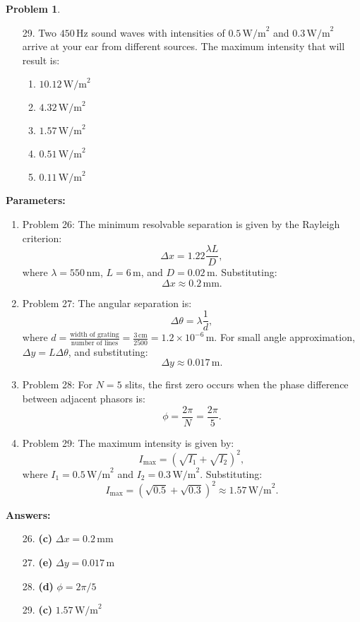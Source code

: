 \documentclass[12pt]{article}
\theoremstyle{definition} %
\newtheorem{problem}{Problem}
\theoremstyle{plain} %
\begin{document}
\begin{problem}
\begin{enumerate}
    \item[29.] Two \(450 \, \text{Hz}\) sound waves with intensities of \(0.5 \, \text{W/m}^2\) and \(0.3 \, \text{W/m}^2\) arrive at your ear from different sources. The maximum intensity that will result is:
    \begin{enumerate}
        \item \(10.12 \, \text{W/m}^2\)
        \item \(4.32 \, \text{W/m}^2\)
        \item \textbf{\(1.57 \, \text{W/m}^2\)}
        \item \(0.51 \, \text{W/m}^2\)
        \item \(0.11 \, \text{W/m}^2\)
    \end{enumerate}
\end{enumerate}

\textbf{Parameters:}
\begin{enumerate}
    \item Problem 26: The minimum resolvable separation is given by the Rayleigh criterion:
    $$
    \Delta x = 1.22 \frac{\lambda L}{D},
    $$
    where \(\lambda = 550 \, \text{nm}\), \(L = 6 \, \text{m}\), and \(D = 0.02 \, \text{m}\). Substituting:
    $$
    \Delta x \approx 0.2 \, \text{mm}.
    $$
    \item Problem 27: The angular separation is:
    $$
    \Delta \theta = \lambda \frac{1}{d},
    $$
    where \(d = \frac{\text{width of grating}}{\text{number of lines}} = \frac{3 \, \text{cm}}{2500} = 1.2 \times 10^{-6} \, \text{m}\). For small angle approximation, \(\Delta y = L \Delta \theta\), and substituting:
    $$
    \Delta y \approx 0.017 \, \text{m}.
    $$
    \item Problem 28: For \(N = 5\) slits, the first zero occurs when the phase difference between adjacent phasors is:
    $$
    \phi = \frac{2\pi}{N} = \frac{2\pi}{5}.
    $$
    \item Problem 29: The maximum intensity is given by:
    $$
    I_{\text{max}} = (\sqrt{I_1} + \sqrt{I_2})^2,
    $$
    where \(I_1 = 0.5 \, \text{W/m}^2\) and \(I_2 = 0.3 \, \text{W/m}^2\). Substituting:
    $$
    I_{\text{max}} = (\sqrt{0.5} + \sqrt{0.3})^2 \approx 1.57 \, \text{W/m}^2.
    $$
\end{enumerate}

\textbf{Answers:}
\begin{enumerate}
    \item[26.] \textbf{(c)} \(\Delta x = 0.2 \, \text{mm}\)
    \item[27.] \textbf{(e)} \(\Delta y = 0.017 \, \text{m}\)
    \item[28.] \textbf{(d)} \(\phi = 2\pi / 5\)
    \item[29.] \textbf{(c)} \(1.57 \, \text{W/m}^2\)
\end{enumerate}
\end{problem}
\end{document}
